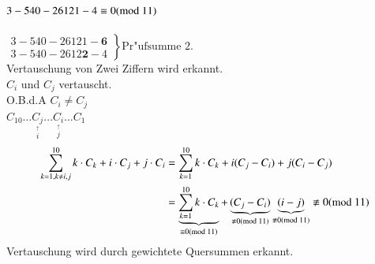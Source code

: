 $3-540-26121-4 \equiv 0(\text{mod }11)$\\ \\
$\left.
\begin{matrix}
	3-540-26121-\mathbf{6} \\
	3-540-2612\mathbf{2}-4
\end{matrix}
\right\} \text{Pr"ufsumme 2.}
$\\
Vertauschung von Zwei Ziffern wird erkannt.\\
$C_i$ und $C_j$ vertauscht.\\
O.B.d.A $C_i \neq C_j$\\
$C_{10} \ldots \underset{\stackrel{\uparrow}{i}}{C_j} \ldots \underset{\stackrel{\uparrow}{j}}{C_i} \ldots C_1$\\
\begin{align*}
	\sum^{10}_{k=1, k\neq i,j} k \cdot C_k + i \cdot 	C_j + j \cdot C_i
	&= \sum^{10}_{k=1} k \cdot C_k + i(C_j-C_i)+j(C_i-C_j)\\
	&= 
	\underbrace{\sum^{10}_{k=1} k \cdot C_k}_{\equiv 0 (\md{11})}
	 + 
	 \underbrace{(C_j-C_i)}_{\nequiv 0 (\md{11})}
	 \underbrace{(i-j)}_{\nequiv 0 (\md{11})}
	 \nequiv 0 (\md{11})
\end{align*}
Vertauschung wird durch gewichtete Quersummen erkannt.


